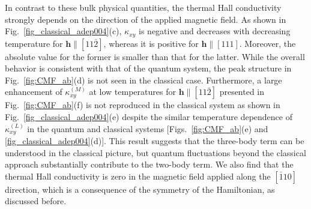 \documentclass[twocolumn,superscriptaddress,showpacs, longbibliography, aps, prb]{revtex4-2}
\def\vec#1{\boldsymbol #1}
\newcommand{\red}[1]{\textcolor{red}{#1}}
\begin{document}
In contrast to these bulk physical quantities, the thermal Hall conductivity strongly depends on the direction of the applied magnetic field.
As shown in Fig.~\ref{fig_classical_adep004}(c), $\kappa_{xy}$ is negative and decreases with decreasing temperature for $\vec{h}\parallel [11\bar{2}]$, 
whereas it is positive for
$\vec{h}\parallel [111]$.
Moreover, the absolute value for the former is smaller than that for the latter.
While %
the overall %
behavior is consistent with that %
of the quantum system, the peak structure in Fig.~\ref{fig:CMF_ab}(d) is not seen in the classical case.
Furthermore, a large enhancement of $\kappa_{xy}^{(M)}$ at low temperatures for $\vec{h}\parallel [11\bar{2}]$ presented in Fig.~\ref{fig:CMF_ab}(f) is not reproduced in the classical system as shown in Fig.~\ref{fig_classical_adep004}(e) despite the %
similar temperature dependence of $\kappa_{xy}^{(L)}$ in the quantum and classical systems [Figs.~\ref{fig:CMF_ab}(e) and \ref{fig_classical_adep004}(d)].
This result suggests that the three-body term can be understood in the classical picture, but quantum fluctuations beyond the classical approach substantially contribute to the two-body term.
We also find that the thermal Hall conductivity is zero in the magnetic field applied along the $[\bar{1}10]$ direction, which is %
a consequence of the symmetry of the Hamiltonian, as discussed before.

\end{document}
